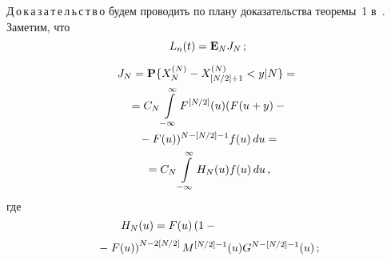 \begin{multicols}{2}
{Д\,о\,к\,а\,з\,а\,т\,е\,л\,ь\,с\,т\,в\,о} будем проводить по плану доказательства
теоремы~1 в~\cite{1pag}.
Заметим, что
$$
L_n(t)={\bf E}_NJ_N\,;
$$

\noindent
\begin{multline}
J_N={\bf P}\{X_N^{(N)}-X_{[N/2]+1}^{(N)}<y|N\}={}\\
{}=C_N\int\limits_{-\infty}^{\infty}F^{[N/2]}(u)(F(u+y)-{}\\
{}-F(u))^{N-[N/2]-1}
f(u)\,du=\\
{}=C_N\int\limits_{-\infty}^{\infty}H_N(u)f(u)\,du\,, \label{5}
\end{multline}
где
$$
H_N(u)= F(u)\left ( 1-{}\right.\hspace*{24mm} %
$$
\begin{equation}
\left. -\;F(u)\right )^{N-2[N/2]}M^{[N/2]-1}(u)G^{N-[N/2]-1}(u)\,;\!\!\!\label{6}\\
\end{equation}



\end{multicols}
